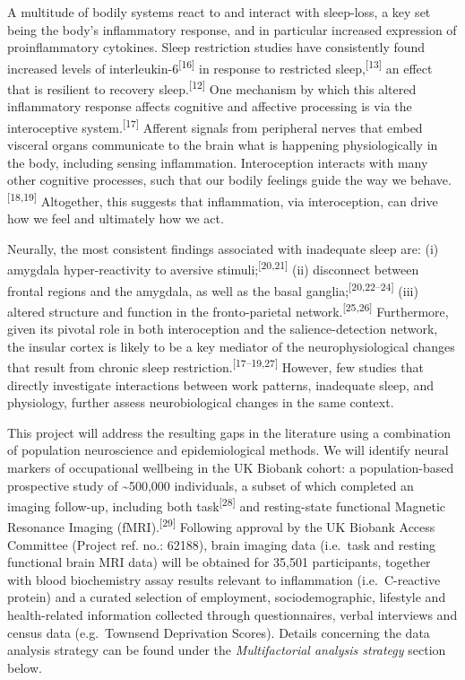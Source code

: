 \documentclass[
  english,
  man, donotrepeattitle,floatsintext]{apa6}
\begin{document}
A multitude of bodily systems react to and interact with sleep-loss, a key set being the body's inflammatory response, and in particular increased expression of proinflammatory cytokines. Sleep restriction studies have consistently found increased levels of interleukin-6\textsuperscript{{[}16{]}} in response to restricted sleep,\textsuperscript{{[}13{]}} an effect that is resilient to recovery sleep.\textsuperscript{{[}12{]}} One mechanism by which this altered inflammatory response affects cognitive and affective processing is via the interoceptive system.\textsuperscript{{[}17{]}} Afferent signals from peripheral nerves that embed visceral organs communicate to the brain what is happening physiologically in the body, including sensing inflammation. Interoception interacts with many other cognitive processes, such that our bodily feelings guide the way we behave.\textsuperscript{{[}18,19{]}} Altogether, this suggests that inflammation, via interoception, can drive how we feel and ultimately how we act.

Neurally, the most consistent findings associated with inadequate sleep are: (i) amygdala hyper-reactivity to aversive stimuli;\textsuperscript{{[}20,21{]}} (ii) disconnect between frontal regions and the amygdala, as well as the basal ganglia;\textsuperscript{{[}20,22--24{]}} (iii) altered structure and function in the fronto-parietal network.\textsuperscript{{[}25,26{]}} Furthermore, given its pivotal role in both interoception and the salience-detection network, the insular cortex is likely to be a key mediator of the neurophysiological changes that result from chronic sleep restriction.\textsuperscript{{[}17--19,27{]}} However, few studies that directly investigate interactions between work patterns, inadequate sleep, and physiology, further assess neurobiological changes in the same context.

This project will address the resulting gaps in the literature using a combination of population neuroscience and epidemiological methods. We will identify neural markers of occupational wellbeing in the UK Biobank cohort: a population-based prospective study of \textasciitilde500,000 individuals, a subset of which completed an imaging follow-up, including both task\textsuperscript{{[}28{]}} and resting-state functional Magnetic Resonance Imaging (fMRI).\textsuperscript{{[}29{]}} Following approval by the UK Biobank Access Committee (Project ref. no.: 62188), brain imaging data (i.e.~task and resting functional brain MRI data) will be obtained for 35,501 participants, together with blood biochemistry assay results relevant to inflammation (i.e.~C-reactive protein) and a curated selection of employment, sociodemographic, lifestyle and health-related information collected through questionnaires, verbal interviews and census data (e.g.~Townsend Deprivation Scores). Details concerning the data analysis strategy can be found under the \emph{Multifactorial analysis strategy} section below.
\end{document}
